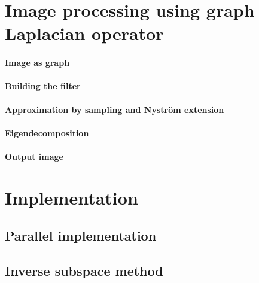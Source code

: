 \documentclass[]{article}
\begin{document}
\section{Image processing using graph Laplacian operator}


\paragraph{Image as graph}


\paragraph{Building the filter}


\paragraph{Approximation by sampling and Nystr\"om extension}


\paragraph{Eigendecomposition}


\paragraph{}


\paragraph{Output image}


\section{Implementation}

\subsection{Parallel implementation}


\subsection{Inverse subspace method}

\end{document}
